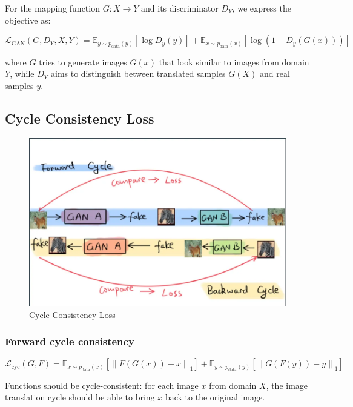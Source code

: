 \documentclass[
]{article}
\begin{document}
For the mapping function \(G:X \rightarrow Y\) and its discriminator \(D_Y\),
we express the objective as:

\[\mathcal{L}_{\text{GAN}}(G,D_Y,X,Y)=\mathbb{E}_{y\sim p_{\text{data}}(y)}[\log{D_y(y)}]+\mathbb{E}_{x\sim p_{\text{data}}(x)}[\log{(1-D_y(G(x)))}]\]

where \(G\) tries to generate images \(G(x)\) that look similar to
images from domain \(Y\), while \(D_Y\) aims to distinguish between
translated samples \(G(X)\) and real samples \(y\).

\hypertarget{cycle-consistency-loss}{%
\subsection{Cycle Consistency Loss}\label{cycle-consistency-loss}}

\begin{figure}
\centering
\includegraphics{./assets/cycle_consistency_loss.png}
\caption{Cycle Consistency Loss}
\end{figure}

\hypertarget{forward-cycle-consistency}{%
\subsubsection{Forward cycle
consistency}\label{forward-cycle-consistency}}

\[\mathcal{L}_{\text{cyc}}(G,F)=\mathbb{E}_{x\sim p_{\text{data}}(x)}[\left\|F(G(x))-x\right\|_1]+\mathbb{E}_{y\sim p_{\text{data}}(y)}[\left\|G(F(y))-y\right\|_1]\]

Functions should be cycle-consistent: for each image \(x\) from domain
\(X\), the image translation cycle should be able to bring \(x\) back to
the original image.
\end{document}
